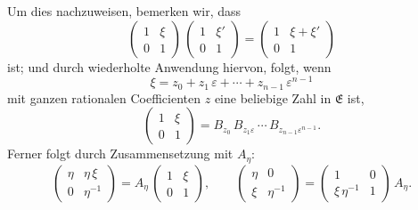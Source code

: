 \documentclass[12pt,a4paper]{article}
\begin{document}
Um dies nachzuweisen, bemerken wir, dass
\[
\begin{pmatrix}1&\xi\\0&1\end{pmatrix}\,
\begin{pmatrix}1&\xi'\\0&1\end{pmatrix}
= \begin{pmatrix}1&\xi + \xi'\\0&1\end{pmatrix}
\]
ist; und durch wiederholte Anwendung hiervon, folgt, wenn
\[
\xi = z_{0} + z_{1}\,\varepsilon + \cdots + z_{n-1}\,\varepsilon^{n-1}
\]
mit ganzen rationalen Coefficienten $z$ eine beliebige Zahl in $\mathfrak{E}$ ist,
\begin{equation}\label{eq:65.9}
\tag{9}
\begin{pmatrix}1&\xi\\0&1\end{pmatrix}
= B_{z_{0}}\,B_{z_{1}\varepsilon}\,\cdots\,B_{z_{n-1}\varepsilon^{n-1}}.
\end{equation}
Ferner folgt durch Zusammensetzung mit $A_{\eta}$:
\begin{equation}\label{eq:65.10}
\tag{10}
\begin{pmatrix}\eta&\eta\,\xi\\0&\eta^{-1}\end{pmatrix}
= A_{\eta}\,\begin{pmatrix}1&\xi\\0&1\end{pmatrix},\qquad
\begin{pmatrix}\eta&0\\\xi&\eta^{-1}\end{pmatrix}
= \begin{pmatrix}1&0\\\xi\,\eta^{-1}&1\end{pmatrix}\,A_{\eta}.
\end{equation}
\end{document}
